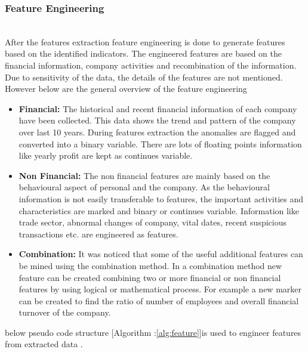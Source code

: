 
\subsubsection{Feature Engineering}\hspace*{\fill} \\
After the features extraction feature engineering is done to generate features based on the identified indicators. The engineered features are based on the financial information, company activities and recombination of the information. Due to sensitivity of the data, the details of the features are not mentioned. However below are the general overview of the feature engineering

\begin{itemize}
    \item \textbf{Financial:} The historical and recent financial information of each company have been collected. This data shows the trend and pattern of the company over last 10 years. During features extraction the anomalies are flagged and converted into a binary variable. There are lots of floating points information like yearly profit are kept as continues variable. 
    
    \item \textbf{Non Financial:} The non financial features are mainly based on the behavioural aspect of personal and the company. As the behavioural information is not easily transferable to features, the important activities and characteristics are marked and binary or continues variable. Information like trade sector, abnormal changes of company, vital dates, recent suspicious transactions etc. are engineered as features.
    
    \item \textbf{Combination:} It was noticed that some of the useful additional features can be mined using the combination method. In a combination method new feature can be created combining two or more financial or non financial features by using logical or mathematical process. For example a new marker can be created to find the ratio of number of employees and overall financial turnover of the company. 
\end{itemize}

below pseudo code structure [Algorithm :\ref{alg:feature}]is used to engineer features from extracted data . 

